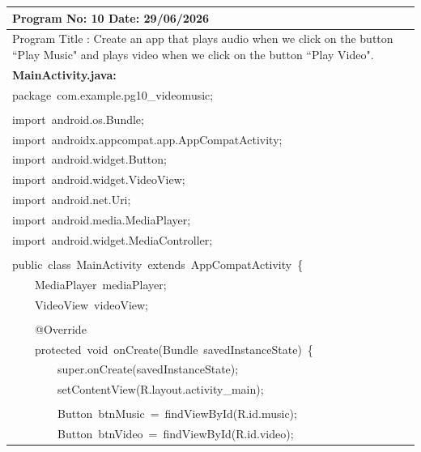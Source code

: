 \documentclass[a4paper,12pt]{article}
\begin{document}
\noindent\begingroup
\renewcommand{\arraystretch}{1.1}
\begin{longtable}{|p{}|}
\hline\endfirsthead\hline\endhead\hline\endfoot\hline\endlastfoot
\rule{0pt}{13pt}Program No: 10 \hfill Date: 29/06/2026 \\
\hline
\rule{0pt}{13pt}Program Title : Create an app that plays audio when we click on the button ``Play Music" and plays video when we click on the button ``Play Video". \\
\hline
\rule{0pt}{13pt}\textbf{MainActivity.java:} \\
\hline
{\ttfamily\small package\ com.example.pg10\_videomusic;} \\
\strut \\
{\ttfamily\small import\ android.os.Bundle;} \\
{\ttfamily\small import\ androidx.appcompat.app.AppCompatActivity;} \\
{\ttfamily\small import\ android.widget.Button;} \\
{\ttfamily\small import\ android.widget.VideoView;} \\
{\ttfamily\small import\ android.net.Uri;} \\
{\ttfamily\small import\ android.media.MediaPlayer;} \\
{\ttfamily\small import\ android.widget.MediaController;} \\
\strut \\
{\ttfamily\small public\ class\ MainActivity\ extends\ AppCompatActivity\ \{} \\
{\ttfamily\small \ \ \ \ MediaPlayer\ mediaPlayer;} \\
{\ttfamily\small \ \ \ \ VideoView\ videoView;} \\
\strut \\
{\ttfamily\small \ \ \ \ @Override} \\
{\ttfamily\small \ \ \ \ protected\ void\ onCreate(Bundle\ savedInstanceState)\ \{} \\
{\ttfamily\small \ \ \ \ \ \ \ \ super.onCreate(savedInstanceState);} \\
{\ttfamily\small \ \ \ \ \ \ \ \ setContentView(R.layout.activity\_main);} \\
\strut \\
{\ttfamily\small \ \ \ \ \ \ \ \ Button\ btnMusic\ =\ findViewById(R.id.music);} \\
{\ttfamily\small \ \ \ \ \ \ \ \ Button\ btnVideo\ =\ findViewById(R.id.video);} \\

\end{longtable}
\end{document}

